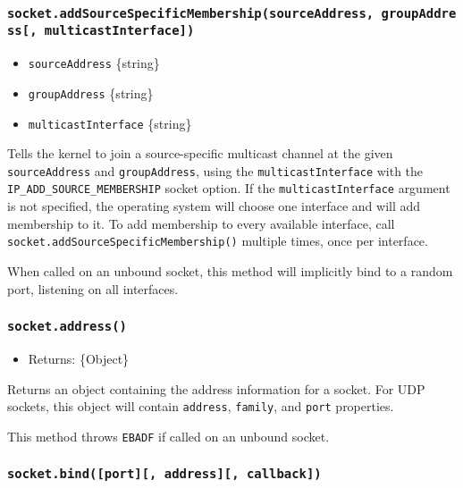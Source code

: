 \subsubsection{\texorpdfstring{\texttt{socket.addSourceSpecificMembership(sourceAddress,\ groupAddress{[},\ multicastInterface{]})}}{socket.addSourceSpecificMembership(sourceAddress, groupAddress{[}, multicastInterface{]})}}\label{socket.addsourcespecificmembershipsourceaddress-groupaddress-multicastinterface}

\begin{itemize}
\tightlist
\item
  \texttt{sourceAddress} \{string\}
\item
  \texttt{groupAddress} \{string\}
\item
  \texttt{multicastInterface} \{string\}
\end{itemize}

Tells the kernel to join a source-specific multicast channel at the
given \texttt{sourceAddress} and \texttt{groupAddress}, using the
\texttt{multicastInterface} with the
\texttt{IP\_ADD\_SOURCE\_MEMBERSHIP} socket option. If the
\texttt{multicastInterface} argument is not specified, the operating
system will choose one interface and will add membership to it. To add
membership to every available interface, call
\texttt{socket.addSourceSpecificMembership()} multiple times, once per
interface.

When called on an unbound socket, this method will implicitly bind to a
random port, listening on all interfaces.

\subsubsection{\texorpdfstring{\texttt{socket.address()}}{socket.address()}}\label{socket.address}

\begin{itemize}
\tightlist
\item
  Returns: \{Object\}
\end{itemize}

Returns an object containing the address information for a socket. For
UDP sockets, this object will contain \texttt{address}, \texttt{family},
and \texttt{port} properties.

This method throws \texttt{EBADF} if called on an unbound socket.

\subsubsection{\texorpdfstring{\texttt{socket.bind({[}port{]}{[},\ address{]}{[},\ callback{]})}}{socket.bind({[}port{]}{[}, address{]}{[}, callback{]})}}\label{socket.bindport-address-callback}


